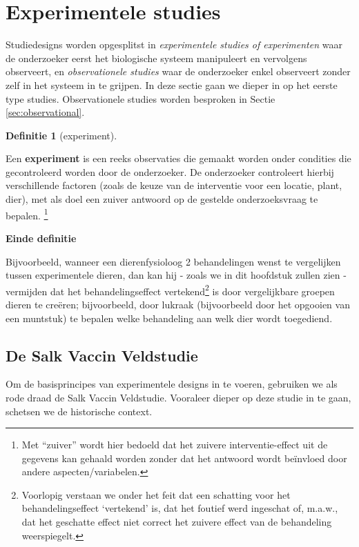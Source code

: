 \documentclass[
  12pt,dutch]{book}
\theoremstyle{definition}
\newtheorem{definition}{Definitie}[chapter]
\theoremstyle{definition}
\theoremstyle{definition}
\theoremstyle{definition}
\theoremstyle{remark}
\begin{document}
\section{Experimentele studies}\label{experimentele-studies}

Studiedesigns worden opgesplitst in \emph{experimentele studies of experimenten} waar de onderzoeker eerst het biologische systeem manipuleert en vervolgens observeert, en \emph{observationele studies} waar de onderzoeker enkel observeert zonder zelf in het systeem in te grijpen. In deze sectie gaan we dieper in op het eerste type studies. Observationele studies worden besproken in Sectie \ref{sec:observational}.

\begin{definition}[experiment]
\protect\hypertarget{def:unnamed-chunk-64}{}\label{def:unnamed-chunk-64}~
\end{definition}

Een \textbf{experiment} is een reeks observaties die gemaakt worden onder
condities die gecontroleerd worden door de onderzoeker. De onderzoeker
controleert hierbij verschillende factoren (zoals de keuze van de
interventie voor een locatie, plant, dier), met als doel een zuiver antwoord op de gestelde onderzoeksvraag te bepalen.
\footnote{Met ``zuiver'' wordt hier bedoeld dat het zuivere interventie-effect uit de gegevens
  kan gehaald worden zonder dat het antwoord wordt beïnvloed door andere aspecten/variabelen.}

\textbf{Einde definitie}

Bijvoorbeeld, wanneer een dierenfysioloog 2 behandelingen wenst te vergelijken tussen experimentele dieren,
dan kan hij - zoals we in dit hoofdstuk zullen zien - vermijden dat het
behandelingseffect vertekend\footnote{ Voorlopig verstaan we onder het feit dat een schatting voor het
  behandelingseffect `vertekend' is, dat het foutief werd ingeschat of, m.a.w., dat het geschatte effect niet correct het zuivere effect van de behandeling weerspiegelt.} is door vergelijkbare groepen dieren te creëren;
bijvoorbeeld, door lukraak (bijvoorbeeld door
het opgooien van een muntstuk) te bepalen welke behandeling aan welk
dier wordt toegediend.

\subsection{De Salk Vaccin Veldstudie}\label{de-salk-vaccin-veldstudie}

Om de basisprincipes van experimentele designs in te voeren, gebruiken we als rode draad de Salk Vaccin Veldstudie. Vooraleer dieper op deze studie in te gaan, schetsen we de historische context.
\end{document}
